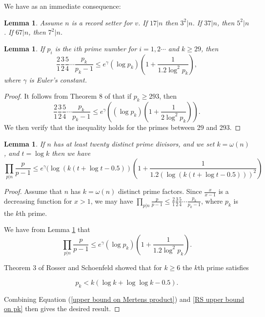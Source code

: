 \documentclass{article}
\newtheorem{lemma}[theorem]{Lemma}
\begin{document}
We have as an immediate consequence:

\begin{lemma} Assume $n$ is a record setter for $v$. If $17|n$ then $3^2|n$. If $37|n$, then $5^2|n$. If $67|n$, then $7^2|n$.\label{when small squares divide n}
\end{lemma}

\begin{lemma} If $p_i$ is the $i$th prime number for $i = 1 ,2 \cdots$ and $k \geq 29$, then
$$ \frac{2}{1} \frac{3}{2} \frac{5}{4}\cdots  \frac{p_k}{p_k-1} \leq  e^\gamma (\log p_k)\left(1+\frac{1}{1.2\log^2 p_k}\right),$$ where $\gamma$ is Euler's constant. \label{Modified RS Merten upper bound}
\end{lemma}
\begin{proof}
It follows from Theorem 8 of \cite{RosserSchoenfeld1962} that if $p_k \geq 293$, then
$$ \frac{2}{1} \frac{3}{2} \frac{5}{4}\cdots  \frac{p_k}{p_k-1} \leq  e^\gamma \left((\log p_k)\left(1+\frac{1}{2\log^2 p_k}\right)\right).$$
We then verify that the inequality holds for the primes between 29 and 293. 
\end{proof}



\begin{lemma} If $n$ has at least twenty distinct prime divisors, and we set $k=\omega(n)$, and $t=\log k$ then we have \begin{equation}\prod_{p|n} \frac{p}{p-1} \leq e^\gamma (\log \left(k \left(t + \log t -0.5 \right)\right)\left(1 + \frac{1}{1.2 \left(\log\left(k \left(t + \log t -0.5 \right) \right)\right)^2}\right)   \end{equation}
\label{Mert product upper bound}
\end{lemma}
\begin{proof} Assume that $n$ has $k=\omega(n)$ distinct prime factors. Since $\frac{x}{x-1}$ is a decreasing function for $x>1$, we may have $\prod_{p|n} \frac{p}{p-1}  \leq \frac{2}{1} \frac{3}{2} \frac{5}{4}\cdots  \frac{p_k}{p_k-1}$, where $p_k$ is the $k$th prime.

We have from Lemma \ref{Modified RS Merten upper bound} that  \begin{equation}\prod_{p|n} \frac{p}{p-1} \leq \label{upper bound on Mertens product} e^\gamma (\log p_k)\left(1+\frac{1}{1.2\log^2 p_k}\right). \end{equation}

Theorem 3 of Rosser and Schoenfeld \cite{RosserSchoenfeld1962} showed that for $k \geq 6$ the $k$th prime satisfies 

\begin{equation}p_k < k(\log  k + \log \log k -0.5).\label{RS upper bound on pk} \end{equation}

Combining Equation (\ref{upper bound on Mertens product}) and \ref{RS upper bound on pk} then gives the desired result.

\end{proof}
\end{document}
